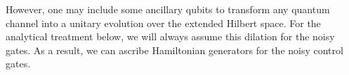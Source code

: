 However, one may include some ancillary qubits to transform any quantum channel into a unitary evolution over the extended Hilbert space. For the analytical treatment below, we will always assume this dilation for the noisy gates. As a result, we can ascribe Hamiltonian generators for the noisy control gates. 